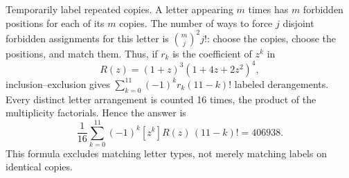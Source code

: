 Temporarily label repeated copies. A letter appearing $m$ times has $m$ forbidden positions for each of its $m$ copies. The number of ways to force $j$ disjoint forbidden assignments for this letter is $\binom mj^2j!$: choose the copies, choose the positions, and match them.
Thus, if $r_k$ is the coefficient of $z^k$ in
\[
R(z)=(1+z)^{3}(1+4z+2z^2)^{4},
\]
inclusion--exclusion gives $\sum_{k=0}^{11}(-1)^kr_k(11-k)!$ labeled derangements. Every distinct letter arrangement is counted 16 times, the product of the multiplicity factorials. Hence the answer is
\[
\boxed{\dfrac{1}{16}\sum_{k=0}^{11}(-1)^k[z^k]R(z)\,(11-k)!=406938}.
\]
This formula excludes matching letter types, not merely matching labels on identical copies.

